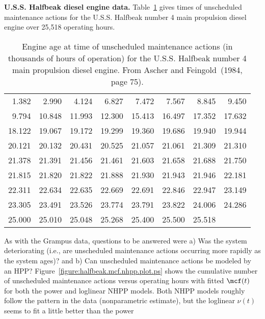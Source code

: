 \begin{example}
{\bf U.S.S. Halfbeak diesel engine data.} 
Table~\ref{table:halfbeak.dat} gives times of
unscheduled maintenance actions for the U.S.S. Halfbeak number 4 main
propulsion diesel engine over 25,518 operating hours.
\begin{table}
\caption{Engine age at time of unscheduled maintenance actions (in thousands of 
hours of operation) for the U.S.S. Halfbeak number 4 main propulsion
diesel engine.  From Ascher and Feingold~(1984, page 75).}
\centering\small
\begin{tabular}{*{8}{r}}
\\[-.5ex]
\hline
  1.382&   2.990&    4.124&    6.827&    7.472&    7.567&    8.845& 9.450\\ 
  9.794&   10.848&   11.993&  12.300&   15.413&   16.497&   17.352& 17.632\\ 
 18.122&   19.067&   19.172&   19.299&   19.360&   19.686&   19.940& 19.944\\ 
 20.121&   20.132&   20.431&   20.525&   21.057&   21.061&   21.309& 21.310\\ 
 21.378&   21.391&   21.456&   21.461&   21.603&   21.658&   21.688& 21.750\\ 
 21.815&   21.820&   21.822&   21.888&   21.930&   21.943&   21.946& 22.181\\ 
 22.311&   22.634&   22.635&   22.669&   22.691&   22.846&   22.947& 23.149\\ 
 23.305&   23.491&   23.526&   23.774&   23.791&   23.822&   24.006& 24.286\\ 
 25.000&   25.010&   25.048&   25.268&   25.400&   25.500&   25.518 \\
\hline      
\end{tabular}
\label{table:halfbeak.dat}
\end{table}
As with the Grampus data, questions to be answered were a) Was the
system deteriorating (i.e., are unscheduled maintenance actions
occurring more rapidly as the system ages)? and b) Can unscheduled
maintenance actions be modeled by an HPP?
Figure~\ref{figure:halfbeak.mcf.nhpp.plot.ps} shows the cumulative
number of unscheduled maintenance actions versus operating hours
with fitted $\mcf(t)$ for both the power and loglinear NHPP
models. Both NHPP models roughly follow the pattern in the data
(nonparametric estimate), but
the loglinear $\nu(t)$ seems to fit a little better than the power

\end{example}
